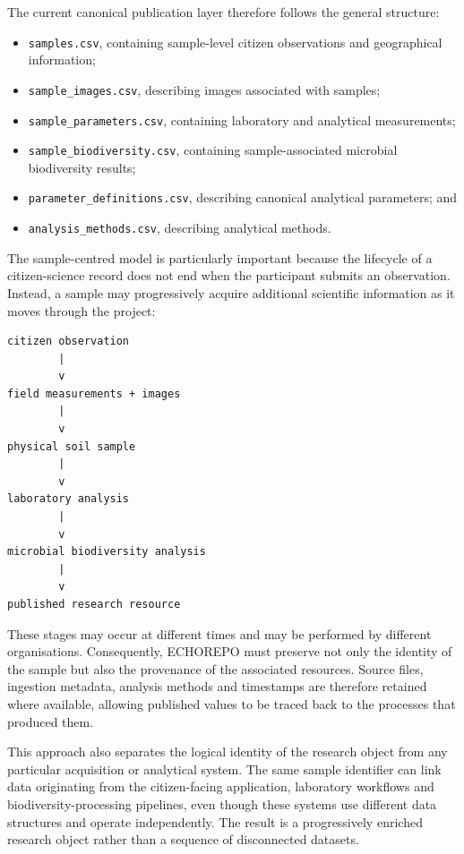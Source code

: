 The current canonical publication layer therefore follows the general structure:

\begin{itemize}
    \item \texttt{samples.csv}, containing sample-level citizen observations and geographical information;
    \item \texttt{sample\_images.csv}, describing images associated with samples;
    \item \texttt{sample\_parameters.csv}, containing laboratory and analytical measurements;
    \item \texttt{sample\_biodiversity.csv}, containing sample-associated
        microbial biodiversity results;
    \item \texttt{parameter\_definitions.csv}, describing canonical analytical
        parameters; and
    \item \texttt{analysis\_methods.csv}, describing analytical methods.
\end{itemize}

The sample-centred model is particularly important because the lifecycle of a citizen-science record does not end when the participant submits an observation. Instead, a sample may progressively acquire additional scientific information as it moves through the project:

\begin{verbatim}
citizen observation
        |
        v
field measurements + images
        |
        v
physical soil sample
        |
        v
laboratory analysis
        |
        v
microbial biodiversity analysis
        |
        v
published research resource
\end{verbatim}

These stages may occur at different times and may be performed by different organisations. Consequently, ECHOREPO must preserve not only the identity of the sample but also the provenance of the associated resources. Source files, ingestion metadata, analysis methods and timestamps are therefore retained where available, allowing published values to be traced back to the processes that produced them.

This approach also separates the logical identity of the research object from any particular acquisition or analytical system. The same sample identifier can link data originating from the citizen-facing application, laboratory workflows and biodiversity-processing pipelines, even though these systems use different data structures and operate independently. The result is a progressively enriched research object rather than a sequence of disconnected datasets.